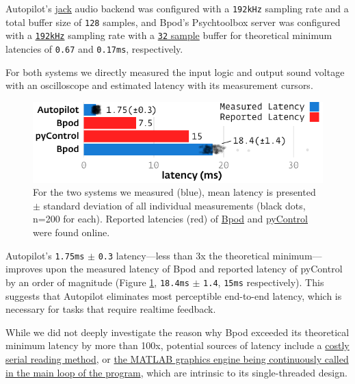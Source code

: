 Autopilot's \href{http://jackaudio.org/}{jack} audio backend was configured with a \texttt{192kHz} sampling rate and a total buffer size of \texttt{128} samples, and Bpod's Psychtoolbox server was configured with a \href{https://github.com/sanworks/Bpod_Gen2/blob/825eaf6ea2cb11da956ee21c42876c4363e9c14e/Functions/Plugins/PsychToolboxAudio/PsychToolboxAudio.m#L25}{\texttt{192kHz}} sampling rate with a \href{https://github.com/sanworks/Bpod_Gen2/blob/825eaf6ea2cb11da956ee21c42876c4363e9c14e/Functions/Plugins/PsychToolboxAudio/PsychToolboxAudio.m#L122}{\texttt{32} sample} buffer for theoretical minimum latencies of \texttt{0.67} and \texttt{0.17ms}, respectively.

For both systems we directly measured the input logic and output sound voltage with an oscilloscope and estimated latency with its measurement cursors. %
%
\begin{figure}[hb!]
\caption{For the two systems we measured (blue), mean latency is presented $\pm$ standard deviation of all individual measurements (black dots, n=200 for each). Reported latencies (red) of \href{https://sites.google.com/site/bpoddocumentation/bpod-user-guide/function-reference/psychtoolboxsoundserver}{Bpod} and \href{https://pycontrol.readthedocs.io/en/latest/user-guide/hardware/\#audio_player}{pyControl} were found online.}
\label{fig:lags}
\includegraphics{figures/test_1_lags.pdf}
\end{figure}

\clearpage

Autopilot's  \texttt{1.75ms} $\pm$ \texttt{0.3} latency---less than 3x the theoretical minimum---improves upon the measured latency of Bpod and reported latency of pyControl by an order of magnitude (Figure \ref{fig:lags}, \texttt{18.4ms} $\pm$ \texttt{1.4}, \texttt{15ms} respectively). This suggests that Autopilot eliminates most perceptible end-to-end latency, which is necessary for tasks that require realtime feedback.

While we did not deeply investigate the reason why Bpod exceeded its theoretical minimum latency by more than 100x, potential sources of latency include a \href{https://github.com/sanworks/Bpod_Gen2/blob/825eaf6ea2cb11da956ee21c42876c4363e9c14e/Functions/Internal\%20Functions/ArCOM/ArCOMObject_Bpod.m#L304}{costly serial reading method}, or \href{https://github.com/sanworks/Bpod/blob/4b756d8251f0a06ee9a442e9cac465872c1b4174/Functions/RunStateMatrix.m#L189}{the MATLAB graphics engine being continuously called in the main loop of the program}, which are intrinsic to its single-threaded design.

